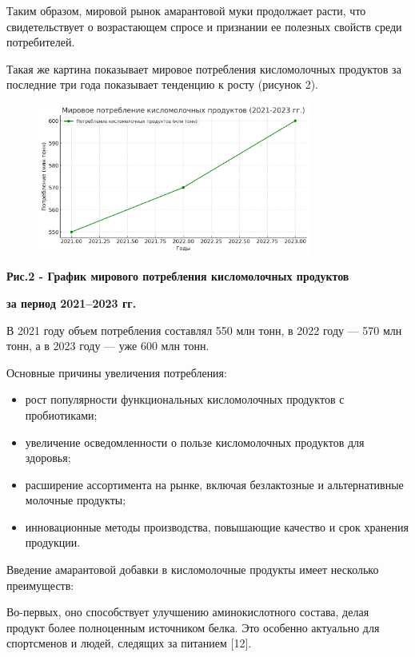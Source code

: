 {Таким образом, мировой рынок амарантовой муки продолжает расти, что
свидетельствует о возрастающем спросе и признании ее полезных свойств
среди потребителей.

Такая же картина показывает мировое потребления кисломолочных продуктов
за последние три года показывает тенденцию к росту (рисунок 2).

\begin{figure}[H]
	\centering
	\includegraphics[width=0.8\textwidth]{media/pish2/image21}
	\caption*{}
\end{figure}


{\bfseries Рис.2 - График мирового потребления кисломолочных продуктов}

{\bfseries за период 2021--2023 гг.}

В 2021 году объем потребления составлял 550 млн тонн, в 2022 году ---
570 млн тонн, а в 2023 году --- уже 600 млн тонн.

Основные причины увеличения потребления:

\begin{itemize}
\item
  рост популярности функциональных кисломолочных продуктов с
  пробиотиками;
\item
  увеличение осведомленности о пользе кисломолочных продуктов для
  здоровья;
\item
  расширение ассортимента на рынке, включая безлактозные и
  альтернативные молочные продукты;
\item
  инновационные методы производства, повышающие качество и срок хранения
  продукции.
\end{itemize}

Введение амарантовой добавки в кисломолочные продукты имеет несколько
преимуществ:

Во-первых, оно способствует улучшению аминокислотного состава, делая
продукт более полноценным источником белка. Это особенно актуально для
спортсменов и людей, следящих за питанием {[}12{]}.

}
